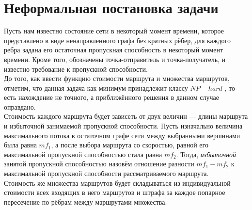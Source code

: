 \documentclass[a4paper]{article}
\begin{document}
\section{Неформальная постановка задачи}
Пусть нам известно состояние сети в некоторый момент времени, которое представлено в виде ненаправленного графа без кратных рёбер, для каждого ребра задана его остаточная пропускная способность в некоторый момент времени. Кроме того, обозначены точка-отправитель и точка-получатель, и известно требование к пропускной способности.\\
До того, как ввести функцию стоимости маршрута и множества маршрутов, отметим, что данная задача как минимум принадлежит классу $NP-hard$ \cite{kmaxmin1}\cite{disjntNPC}, то есть нахождение не точного, а приближённого решения в данном случае оправдано.\\
Стоимость каждого маршрута будет зависеть от двух величин --- длины маршрута и избыточной занимаемой пропускной способности. 
Пусть изначально величина максимального потока в остаточном графе сети между выбранными вершинами была равна $mf_1$, а после выбора маршрута со скоростью, равной его максимальной пропускной способностью стала равна $mf_2$. Тогда, \textit{избыточной} занятой пропускной способностью назовём отношение разности $mf_1 - mf_2$ к максимальной пропускной способности рассматриваемого маршрута.\\
Стоимость же множества маршрутов будет складываться из индивидуальной стоимости всех входящих в него маршрутов и штрафа за каждое попарное пересечение по рёбрам между маршрутами множества.\\
\end{document}
